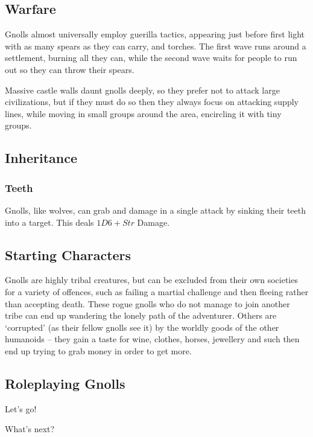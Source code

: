 \begin{multicols}{2}
\subsection{Warfare}

Gnolls almost universally employ guerilla tactics, appearing just before first light with as many spears as they can carry, and torches.
The first wave runs around a settlement, burning all they can, while the second wave waits for people to run out so they can throw their spears.

Massive castle walls daunt gnolls deeply, so they prefer not to attack large civilizations, but if they must do so then they always focus on attacking supply lines, while moving in small groups around the area, encircling it with tiny groups.

\subsection{Inheritance}

\subsubsection[Teeth: deal 1D6 + Strength Damage while brawling]{Teeth}
\label{gnollishInheritance}

Gnolls, like wolves, can grab and damage in a single attack by sinking their teeth into a target.
This deals $1D6 + Str$ Damage.

\subsection{Starting Characters}

Gnolls are highly tribal creatures, but can be excluded from their own societies for a variety of offences, such as failing a martial challenge and then fleeing rather than accepting death.
These rogue gnolls who do not manage to join another tribe can end up wandering the lonely path of the adventurer.
Others are `corrupted' (as their fellow gnolls see it) by the worldly goods of the other humanoids -- they gain a taste for wine, clothes, horses, jewellery and such then end up trying to grab money in order to get more.

\subsection{Roleplaying Gnolls}

Let's go!


{\raggedleft What's next?\par}


\end{multicols}

